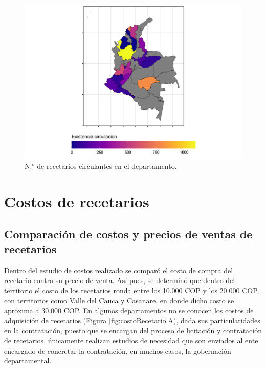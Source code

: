 \documentclass[
  oneside]{book}
\begin{document}
\begin{figure}

{\centering \includegraphics[width=0.85\linewidth]{InformeFinal_files/figure-latex/existenciasRecetarios2-1} 

}

\caption{N.° de recetarios circulantes en el departamento.}\label{fig:existenciasRecetarios2}
\end{figure}

\hypertarget{costos-de-recetarios}{%
\section{Costos de recetarios}\label{costos-de-recetarios}}


\hypertarget{comparaciuxf3n-de-costos-y-precios-de-ventas-de-recetarios}{%
\subsection{Comparación de costos y precios de ventas de recetarios}\label{comparaciuxf3n-de-costos-y-precios-de-ventas-de-recetarios}}

Dentro del estudio de costos realizado se comparó el costo de compra del recetario contra su precio de venta. Así pues, se determinó que dentro del territorio el costo de los recetarios ronda entre los 10.000 COP y los 20.000 COP, con territorios como Valle del Cauca y Casanare, en donde dicho costo se aproxima a 30.000 COP. En algunos departamentos no se conocen los costos de adquisición de recetarios (Figura \ref{fig:costoRecetario}A), dada sus particularidades en la contratación, puesto que se encargan del proceso de licitación y contratación de recetarios, únicamente realizan estudios de necesidad que son enviados al ente encargado de concretar la contratación, en muchos casos, la gobernación departamental.
\end{document}
